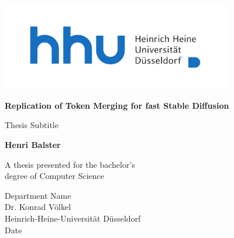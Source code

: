 \begin{titlepage}
    \centering
    \includegraphics[width=10cm]{static/Logo_HHU_+Name_horizontal_4c_+Safezone}\\

    \vspace*{2cm}

    \huge
    \textbf{Replication of Token Merging for fast Stable Diffusion}
    
    \large
    \vspace{1cm}
    Thesis Subtitle
            
    \vspace{1.5cm}

    \textbf{Henri Balster}

    \vfill
            
    A thesis presented for the bachelor's\\
    degree of Computer Science
            
    \vspace{0.8cm}
            
    Department Name\\
    Dr. Konrad Völkel\\
    Heinrich-Heine-Universität Düsseldorf\\
    Date
            
\end{titlepage}